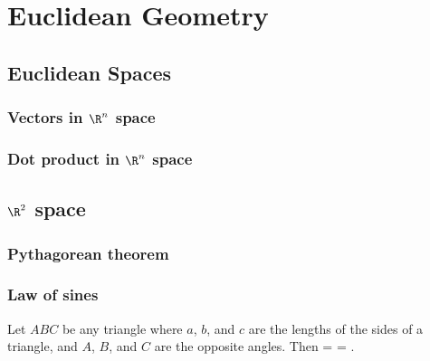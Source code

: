 \chapter{Euclidean Geometry}

\section{Euclidean Spaces}

\subsection{Vectors in $\R^n$ space}

\subsection{Dot product in $\R^n$ space}



\section{$\R^2$ space}


\subsection{Pythagorean theorem}

\subsection{Law of sines}

\begin{theorem}\label{thm:law_of_sines}
Let $ABC$ be any triangle where $a$, $b$, and $c$ are the lengths of the sides of a triangle, and $A$, $B$, and $C$ are the opposite angles. Then
\be
  =  = .
\ee
\end{theorem}


